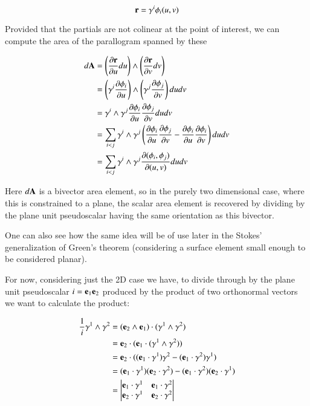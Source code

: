 \documentclass{article}
\newcommand{\PD}[2]{\frac{\partial {#2}}{\partial {#1}}}
\begin{document}
\begin{equation*}
\mathbf{r} = \gamma^{i} \phi_i(u,v)
\end{equation*}

Provided that the partials are not colinear at the point of interest, we can compute the area of the parallogram spanned by these

\begin{align*}
d\BA 
&= \left(\PD{u}{\Br} du\right) \wedge \left(\PD{v}{\Br} dv\right) \\
&= \left(\gamma^{i} \PD{u}{\phi_i}\right) \wedge \left(\gamma^{j} \PD{v}{\phi_j} \right) du dv \\
&= \gamma^{i} \wedge \gamma^{j} \PD{u}{\phi_i} \PD{v}{\phi_j} du dv \\
&= \sum_{i<j} \gamma^{i} \wedge \gamma^{j} \left( \PD{u}{\phi_i} \PD{v}{\phi_j} - \PD{u}{\phi_i} \PD{v}{\phi_i} \right) du dv \\
&= \sum_{i<j} \gamma^{i} \wedge \gamma^{j} \PD{(u,v)}{(\phi_i,\phi_j)} du dv \\
\end{align*}

Here $d\mathbf{A}$ is a bivector area element, so in the purely two dimensional case, where this is constrained to a plane, the scalar area element
is recovered by dividing by the plane unit pseudoscalar having the same orientation as this bivector.

One can also see how the same idea will be of use later in the Stokes' generalization of Green's theorem (considering a surface element small enough to be considered planar).

For now, considering just the 2D case we have, to divide through by the plane unit pseudoscalar $i = \mathbf{e}_1\mathbf{e}_2$ produced by the product of two orthonormal vectors we want to calculate the product:

\begin{align*}
\frac{1}{i} \gamma^{1} \wedge \gamma^{2} 
&= (\mathbf{e}_2 \wedge \mathbf{e}_1) \cdot (\gamma^{1} \wedge \gamma^{2}) \\
&= \mathbf{e}_2 \cdot (\mathbf{e}_1 \cdot (\gamma^{1} \wedge \gamma^{2})) \\
&= \mathbf{e}_2 \cdot ( (\mathbf{e}_1 \cdot \gamma^{1}) \gamma^{2} -(\mathbf{e}_1 \cdot \gamma^{2}) \gamma^{1} ) \\
&= (\mathbf{e}_1 \cdot \gamma^{1}) (\mathbf{e}_2 \cdot \gamma^{2}) -(\mathbf{e}_1 \cdot \gamma^{2}) (\mathbf{e}_2 \cdot \gamma^{1}) \\
&=
\begin{vmatrix}
\mathbf{e}_1 \cdot \gamma^{1} & \mathbf{e}_1 \cdot \gamma^{2} \\
\mathbf{e}_2 \cdot \gamma^{1} & \mathbf{e}_2 \cdot \gamma^{2}
\end{vmatrix}
\end{align*}
\end{document}
